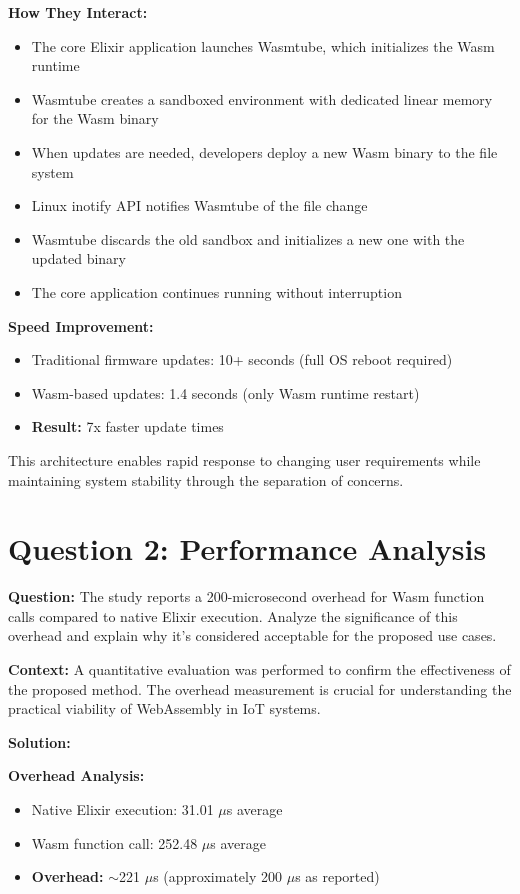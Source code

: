 \documentclass[11pt]{article}
\begin{document}
\textbf{How They Interact:}
\begin{itemize}
\item The core Elixir application launches Wasmtube, which initializes the Wasm runtime
\item Wasmtube creates a sandboxed environment with dedicated linear memory for the Wasm binary
\item When updates are needed, developers deploy a new Wasm binary to the file system
\item Linux inotify API notifies Wasmtube of the file change
\item Wasmtube discards the old sandbox and initializes a new one with the updated binary
\item The core application continues running without interruption
\end{itemize}

\textbf{Speed Improvement:}
\begin{itemize}
\item Traditional firmware updates: 10+ seconds (full OS reboot required)
\item Wasm-based updates: 1.4 seconds (only Wasm runtime restart)
\item \textbf{Result:} 7x faster update times
\end{itemize}

This architecture enables rapid response to changing user requirements while maintaining system stability through the separation of concerns.

\section*{Question 2: Performance Analysis}

\textbf{Question:} The study reports a 200-microsecond overhead for Wasm function calls compared to native Elixir execution. Analyze the significance of this overhead and explain why it's considered acceptable for the proposed use cases.

\textbf{Context:} A quantitative evaluation was performed to confirm the effectiveness of the proposed method. The overhead measurement is crucial for understanding the practical viability of WebAssembly in IoT systems.

\textbf{Solution:}

\textbf{Overhead Analysis:}
\begin{itemize}
\item Native Elixir execution: 31.01 $\mu$s average
\item Wasm function call: 252.48 $\mu$s average
\item \textbf{Overhead:} $\sim$221 $\mu$s (approximately 200 $\mu$s as reported)
\end{itemize}
\end{document}
